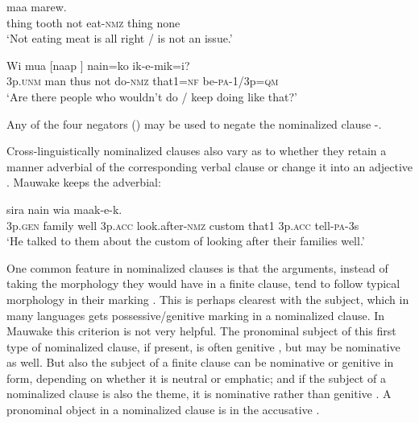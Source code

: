 \ea%
\label{ex:5:x1235}
  maa  marew. \\
     thing  tooth  not  eat-\textsc{nmz}  thing  none \\
\glt `Not eating meat is all right / is not an issue.'
\z

\ea%
\label{ex:5:x1236}
\gll Wi  mua  [naap   ]  nain=ko  ik-e-mik=i? \\
     3p.\textsc{unm}  man  thus  not  do-\textsc{nmz}  that1=\textsc{nf}  be-\textsc{pa}-1/3p=\textsc{qm} \\
\glt `Are there people who wouldn't do / keep doing like that?'
\z

Any of the four negators () may be used to negate the nominalized clause -. 

Cross-linguistically nominalized clauses also vary as to whether they retain a manner adverbial of the corresponding verbal clause or change it into an adjective \citep[374]{ComrieEtAl2007}%
. Mauwake keeps the adverbial: 

\ea%
\label{ex:5:x1237}
  sira  nain wia  maak-e-k. \\
     3p.\textsc{gen}  family  well  3p.\textsc{acc}  look.after-\textsc{nmz}  custom  that1 3p.\textsc{acc}  tell-\textsc{pa}-3s \\
\glt `He talked to them about the custom of looking after their families well.'
\z

One common feature in nominalized clauses is that the arguments, instead of taking the morphology they would have in a finite clause, tend to follow typical  morphology in their marking \citep[738]{HopperEtAl1984}%
. This is perhaps clearest with the subject, which in many languages gets possessive/genitive marking in a nominalized clause. In Mauwake this criterion is not very helpful. The pronominal subject of this first type of nominalized clause, if present, is often genitive , but may be nominative as well. But also the subject of a finite clause can be nominative or genitive in form, depending on whether it is neutral or emphatic; and if the subject of a nominalized clause is also the theme, it is nominative rather than genitive . A pronominal object in a nominalized clause is in the accusative . 

